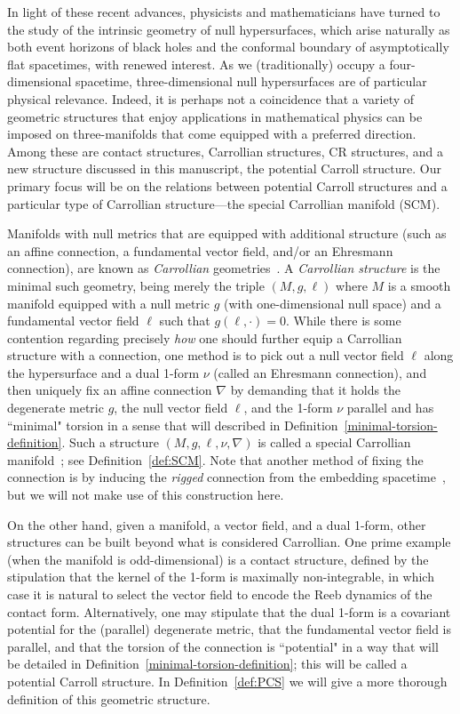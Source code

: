 \documentclass{article}
\theoremstyle{definition}
\theoremstyle{remark}
\begin{document}
In light of these recent advances, physicists and mathematicians have turned to the study of the intrinsic geometry of null hypersurfaces, which arise naturally as both event horizons of black holes and the conformal boundary of asymptotically flat spacetimes, with renewed interest. As we (traditionally) occupy a four-dimensional spacetime, three-dimensional null hypersurfaces are of particular physical relevance. Indeed, it is perhaps not a coincidence that a variety of geometric structures that enjoy applications in mathematical physics can be imposed on three-manifolds that come equipped with a preferred direction. Among these are contact structures, Carrollian structures, CR structures, and a new structure discussed in this manuscript, the potential Carroll structure. Our primary focus will be on the relations between potential Carroll structures and a particular type of Carrollian structure---the special Carrollian manifold (SCM).

Manifolds with null metrics that are equipped with additional structure (such as an affine connection, a fundamental vector field, and/or an Ehresmann connection), are known as \textit{Carrollian} geometries~\cite{Duval:2014uva}. A \textit{Carrollian structure} is the minimal such geometry, being merely the triple $(M,g,\ell)$ where $M$ is a smooth manifold equipped with a null metric $g$ (with one-dimensional null space) and a fundamental vector field $\ell$ such that $g(\ell,\cdot) = 0$. While there is some contention regarding precisely \textit{how} one should further equip a Carrollian structure with a connection, one method is to pick out a null vector field $\ell$ along the hypersurface and a dual 1-form $\nu$ (called an Ehresmann connection), and then uniquely fix an affine connection $\nabla$ by demanding that it holds the degenerate metric $g$, the null vector field $\ell$, and the 1-form $\nu$ parallel and has ``minimal" torsion in a sense that will described in Definition~\ref{minimal-torsion-definition}. Such a structure $(M,g,\ell, \nu, \nabla)$ is called a special Carrollian manifold~\cite{BlitzMcNutt}; see Definition~\ref{def:SCM}. Note that another method of fixing the connection is by inducing the \textit{rigged} connection from the embedding spacetime~\cite{MarsSenovilla}, but we will not make use of this construction here.

On the other hand, given a manifold, a vector field, and a dual 1-form, other structures can be built beyond what is considered Carrollian. One prime example (when the manifold is odd-dimensional) is a contact structure, defined by the stipulation that the kernel of the 1-form is maximally non-integrable, in which case it is natural to select the vector field to encode the Reeb dynamics of the contact form. Alternatively, one may stipulate that the dual 1-form is a covariant potential for the (parallel) degenerate metric, that the fundamental vector field is parallel, and that the torsion of the connection is ``potential" in a way that will be detailed in Definition~\ref{minimal-torsion-definition}; this will be called a potential Carroll structure. In Definition~\ref{def:PCS} we will give a more thorough definition of this geometric structure.
\end{document}
